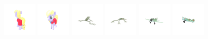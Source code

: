 \begin{figure}[htbp]
  \includegraphics[width=0.15\textwidth]{images/data/samples/7.1.jpeg}\hspace{0.01\textwidth}%
  \includegraphics[width=0.15\textwidth]{images/data/samples/7.2.jpeg}\hfill
  \includegraphics[width=0.15\textwidth]{images/data/samples/8.1.jpeg}\hspace{0.01\textwidth}%
  \includegraphics[width=0.15\textwidth]{images/data/samples/8.2.jpeg}\hfill
  \includegraphics[width=0.15\textwidth]{images/data/samples/9.1.jpeg}\hspace{0.01\textwidth}%
  \includegraphics[width=0.15\textwidth]{images/data/samples/9.2.jpeg}\\\\
  \vspace{2mm}


\end{figure}
